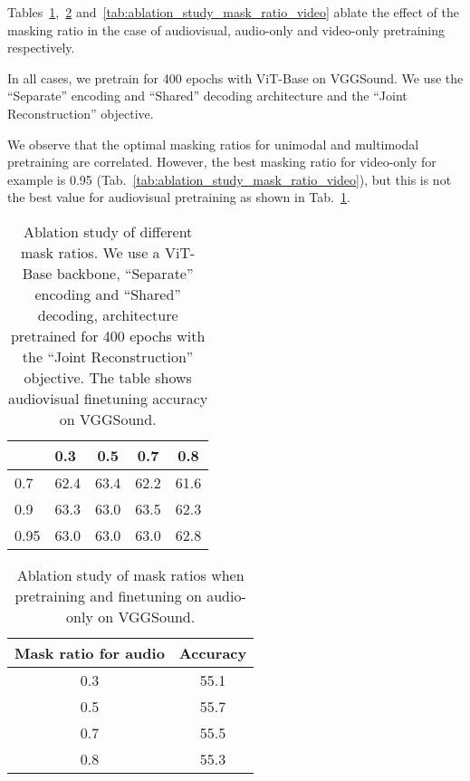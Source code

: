 \documentclass[10pt,twocolumn,letterpaper]{article}
\begin{document}
Tables~\ref{tab:ablation_study_mask_ratio_joint},~\ref{tab:ablation_study_mask_ratio_audio} and~\ref{tab:ablation_study_mask_ratio_video} ablate the effect of the masking ratio in the case of audiovisual, audio-only and video-only pretraining respectively.

In all cases, we pretrain for 400 epochs with ViT-Base on VGGSound.
We use the ``Separate'' encoding and ``Shared'' decoding architecture and the ``Joint Reconstruction'' objective.

We observe that the optimal masking ratios for unimodal and multimodal pretraining are correlated.
However, the best masking ratio for video-only for example is 0.95 (Tab.~\ref{tab:ablation_study_mask_ratio_video}), but this is not the best value for audiovisual pretraining as shown in Tab.~\ref{tab:ablation_study_mask_ratio_joint}.


\begin{table}[t] 
	\caption{Ablation study of different mask ratios.
		 	       We use a ViT-Base backbone, ``Separate'' encoding and ``Shared'' decoding, architecture pretrained for 400 epochs with the ``Joint Reconstruction'' objective.
	 	       		The table shows audiovisual finetuning accuracy on VGGSound.
 	       			}
	\vspace{-0.6\baselineskip}
	\centering
		\begin{tabular}{llccc}
			\toprule 
			\diagbox{Video}{Audio}  &  0.3  & 0.5 & 0.7 & 0.8\\
			\midrule
			
			0.7          &  62.4 & 63.4 &  62.2 & 61.6     \\
			0.9          &  63.3 & 63.0 &  63.5 & 62.3   \\
			0.95         &  63.0 & 63.0 &  63.0 & 62.8 \\
			
			\bottomrule
		\end{tabular}
		\label{tab:ablation_study_mask_ratio_joint}
\end{table} 

\begin{table}[t] 
	\caption{Ablation study of mask ratios when pretraining and finetuning on audio-only on VGGSound. 
	}
	\vspace{-0.6\baselineskip}
	\centering
		\begin{tabular}{cc}
			\toprule 
			Mask ratio for audio &  Accuracy \\
			\midrule
			
			0.3       & 55.1  \\   0.5       & 55.7   \\  
			0.7       & 55.5 \\  0.8       & 55.3 \\   

			\bottomrule
		\end{tabular}
		\label{tab:ablation_study_mask_ratio_audio}	
\end{table} 
\end{document}
